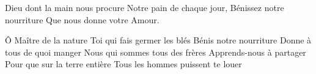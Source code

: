 \beginverse*
Dieu dont la main nous procure
Notre pain de chaque jour,
Bénissez notre nourriture
Que nous donne votre Amour.
\endverse
\endsong

\beginverse*
Ô Maître de la nature
Toi qui fais germer les blés
Bénis notre nourriture
Donne à tous de quoi manger
Nous qui sommes tous des frères
Apprends-nous à partager
Pour que sur la terre entière
Tous les hommes puissent te louer
\endverse
\endsong
